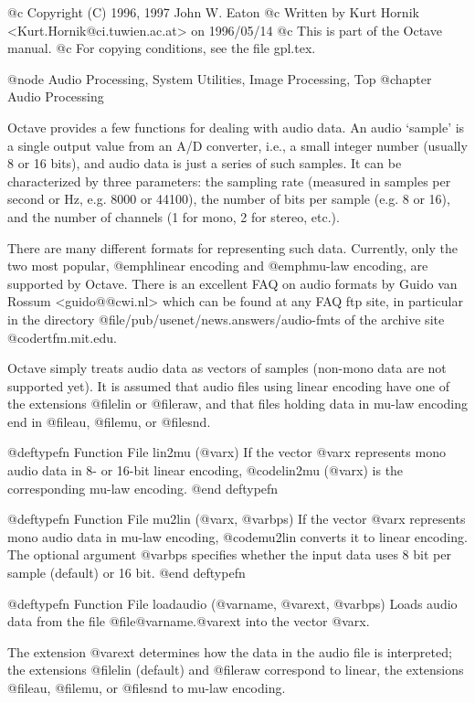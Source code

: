 @c Copyright (C) 1996, 1997 John W. Eaton
@c Written by Kurt Hornik <Kurt.Hornik@ci.tuwien.ac.at> on 1996/05/14
@c This is part of the Octave manual.
@c For copying conditions, see the file gpl.tex.

@node Audio Processing, System Utilities, Image Processing, Top
@chapter Audio Processing

Octave provides a few functions for dealing with audio data.  An audio
`sample' is a single output value from an A/D converter, i.e., a small
integer number (usually 8 or 16 bits), and audio data is just a series
of such samples.  It can be characterized by three parameters:  the
sampling rate (measured in samples per second or Hz, e.g. 8000 or
44100), the number of bits per sample (e.g. 8 or 16), and the number of
channels (1 for mono, 2 for stereo, etc.).

There are many different formats for representing such data.  Currently,
only the two most popular, @emph{linear encoding} and @emph{mu-law
encoding}, are supported by Octave.  There is an excellent FAQ on audio
formats by Guido van Rossum <guido@@cwi.nl> which can be found at any
FAQ ftp site, in particular in the directory
@file{/pub/usenet/news.answers/audio-fmts} of the archive site
@code{rtfm.mit.edu}.

Octave simply treats audio data as vectors of samples (non-mono data are
not supported yet).  It is assumed that audio files using linear
encoding have one of the extensions @file{lin} or @file{raw}, and that
files holding data in mu-law encoding end in @file{au}, @file{mu}, or
@file{snd}.

@deftypefn {Function File} {} lin2mu (@var{x})
If the vector @var{x} represents mono audio data in 8- or 16-bit
linear encoding, @code{lin2mu (@var{x})} is the corresponding mu-law
encoding.
@end deftypefn

@deftypefn {Function File} {} mu2lin (@var{x}, @var{bps})
If the vector @var{x} represents mono audio data in mu-law encoding,
@code{mu2lin} converts it to linear encoding.  The optional argument
@var{bps} specifies whether the input data uses 8 bit per sample
(default) or 16 bit.
@end deftypefn

@deftypefn {Function File} {} loadaudio (@var{name}, @var{ext}, @var{bps})
Loads audio data from the file @file{@var{name}.@var{ext}} into the
vector @var{x}.  

The extension @var{ext} determines how the data in the audio file is
interpreted;  the extensions @file{lin} (default) and @file{raw}
correspond to linear, the extensions @file{au}, @file{mu}, or @file{snd}
to mu-law encoding.


